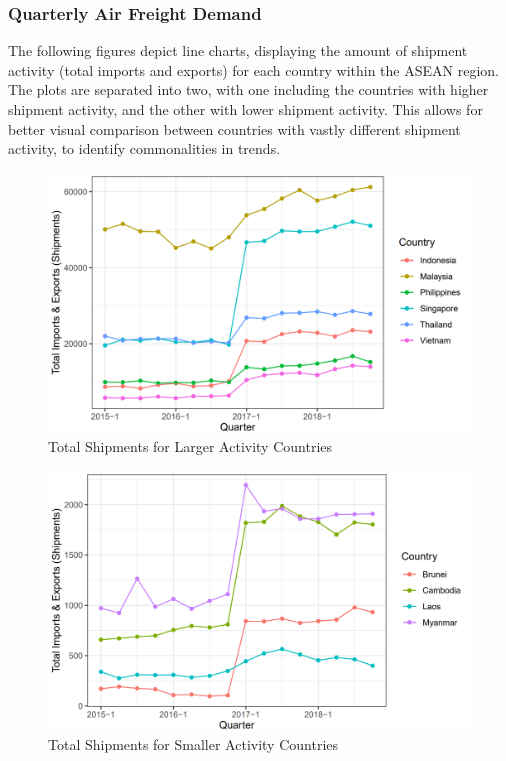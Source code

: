 \documentclass{article}
\begin{document}
\newpage

\subsubsection{Quarterly Air Freight Demand}
The following figures depict line charts, displaying the amount of shipment activity (total imports and exports) for each country within the ASEAN region. The plots are separated into two, with one including the countries with higher shipment activity, and the other with lower shipment activity. This allows for better visual comparison between countries with vastly different shipment activity, to identify commonalities in trends.

\begin{subfigures}
    \begin{figure}[H]
        \centering
        \includegraphics[width=1\textwidth]{images/Line Plots/ASEAN/ASEAN_Large_Quarterly_Shipments_BigFont.png}
        \caption{\label{fig2}Total Shipments for Larger Activity Countries}
    \end{figure}
    
    \begin{figure}[H]
        \centering
        \includegraphics[width=1\textwidth]{images/Line Plots/ASEAN/ASEAN_Small_Quarterly_Shipments.png}
        \caption{\label{fig2}Total Shipments for Smaller Activity Countries}
    \end{figure}
\end{subfigures}
\end{document}
